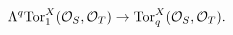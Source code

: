 \begin{equation}
\label{higherq}
\Lambda^q\mbox{Tor}_1^X({\cal O}_S, {\cal O}_T)\to
\mbox{Tor}_q^X({\cal O}_S, {\cal O}_T).
\end{equation}

